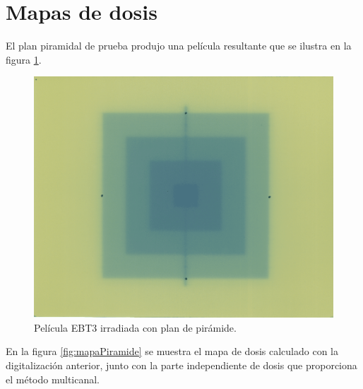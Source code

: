 \section{Mapas de dosis}


El plan piramidal de prueba produjo una película resultante que se ilustra en la figura \ref{fig:piramideEscaneada}.\\
\begin{figure}[H]
	\centering
	\includegraphics[width=0.7\linewidth]{images/peliculaPiramide.png}
	\caption{Película EBT3 irradiada con plan de pirámide. }
	\label{fig:piramideEscaneada}
\end{figure}

En la figura \ref{fig:mapaPiramide} se muestra el mapa de dosis calculado con la digitalización anterior, junto con la parte independiente de dosis que proporciona el método multicanal.\\

